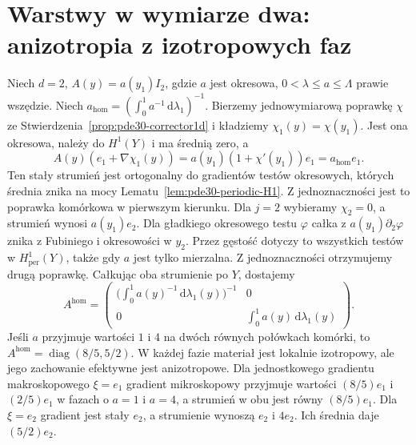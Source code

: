 \section{Warstwy w wymiarze dwa: anizotropia z izotropowych faz}
\begin{przyklad}\label{ex:pde30-layer}
Niech $d=2$, $A(y)=a(y_1)I_2$, gdzie $a$ jest okresowa,
$0<\lambda\le a\le\Lambda$ prawie wszędzie.
Niech $a_{\mathrm{hom}}=(\int_0^1 a^{-1}
\,\mathrm d\lambda_1)^{-1}$.
Bierzemy jednowymiarową poprawkę $\chi$ ze
Stwierdzenia~\ref{prop:pde30-corrector1d} i kładziemy
$\chi_1(y)=\chi(y_1)$. Jest ona okresowa, należy
do $H^1(Y)$ i ma średnią zero, a
\[
 A(y)(e_1+\nabla\chi_1(y))
 =a(y_1)(1+\chi'(y_1))e_1=a_{\mathrm{hom}}e_1.
\]
Ten stały strumień jest ortogonalny do gradientów
testów okresowych, których średnia znika na mocy
Lematu~\ref{lem:pde30-periodic-H1}. Z jednoznaczności
jest to poprawka komórkowa w pierwszym kierunku.
Dla $j=2$ wybieramy $\chi_2=0$, a strumień
wynosi $a(y_1)e_2$. Dla gładkiego okresowego
testu $\varphi$ całka z $a(y_1)\partial_2\varphi$
znika z Fubiniego i okresowości w $y_2$.
Przez gęstość dotyczy to wszystkich testów w
$H^1_{\mathrm{per}}(Y)$, także gdy $a$ jest
tylko mierzalna. Z jednoznaczności otrzymujemy
drugą poprawkę. Całkując oba strumienie po $Y$,
dostajemy
\begin{equation}\label{eq:pde30-layers}
 A^{\mathrm{hom}}=
 \begin{pmatrix}
  \bigl(\int_0^1 a(y)^{-1}\,\mathrm d\lambda_1(y)\bigr)^{-1}&0\\
  0&\int_0^1a(y)\,\mathrm d\lambda_1(y)
 \end{pmatrix}.
\end{equation}
Jeśli $a$ przyjmuje wartości $1$ i $4$ na dwóch równych
połówkach komórki, to $A^{\mathrm{hom}}=\operatorname{diag}(8/5,5/2)$.
W każdej fazie materiał jest lokalnie izotropowy,
ale jego zachowanie efektywne jest anizotropowe.
Dla jednostkowego gradientu makroskopowego $\xi=e_1$
gradient mikroskopowy przyjmuje wartości $(8/5)e_1$
i $(2/5)e_1$ w fazach o $a=1$ i $a=4$,
a strumień w obu jest równy $(8/5)e_1$.
Dla $\xi=e_2$ gradient jest stały $e_2$,
a strumienie wynoszą $e_2$ i $4e_2$.
Ich średnia daje $(5/2)e_2$.
\end{przyklad}

